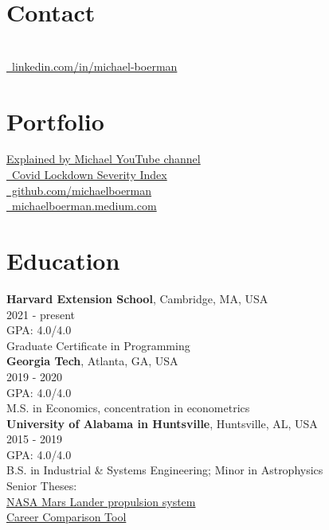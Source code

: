 \documentclass[margin,line]{res}
\begin{document}

\begin{resume}
\section{\sc Contact}
\vspace{.05in}

 \\
\faLinkedinIn  \href{linkedin.com/in/michael-boerman}{\ttfamily \, linkedin.com/in/michael-boerman}\\

\section{\sc Portfolio}
 \href{https://www.youtube.com/channel/UCxFMrMb6PrS7SOrQi-BfMUw/videos?view=0&sort=p&flow=grid}{ Explained by Michael YouTube channel}\\
\faChartLine \href{https://github.com/michaelboerman/lockdown_severity_index#readme}{\, Covid Lockdown Severity Index}\\
\faGithub \href{https://github.com/michaelboerman}{\ttfamily \, github.com/michaelboerman}\\ 
\faMediumM \href{https://michaelboerman.medium.com/}{\ttfamily  \, michaelboerman.medium.com}\\


\section{\sc Education}
{\bf Harvard Extension School}, Cambridge, MA, USA\\
2021 - present\\
GPA: 4.0/4.0\\
Graduate Certificate in Programming\\

{\bf Georgia Tech}, Atlanta, GA, USA\\
2019 - 2020\\
GPA: 4.0/4.0\\
M.S. in Economics, concentration in econometrics\\

{\bf University of Alabama in Huntsville}, Huntsville, AL, USA\\
2015 - 2019\\
GPA: 4.0/4.0\\
B.S. in Industrial \& Systems Engineering; Minor in Astrophysics\\
Senior Theses: \\
\hspace{5mm}{\it -- Systems Engineering:} \href{https://tinyurl.com/ISEEM-SD}{NASA Mars Lander propulsion system}\\
\hspace{5mm}{\it -- Economic Decision Analysis:} \href{http://tinyurl.com/BoermanCareerChoice
}{Career Comparison Tool}


\end{resume}
\end{document}
